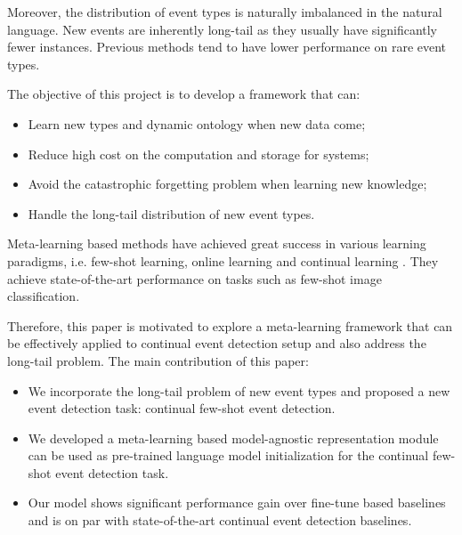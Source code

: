 Moreover, the distribution of event types is naturally imbalanced in the natural language.  New events are inherently long-tail \citep{yu2021lifelong} as they usually have significantly fewer instances. Previous methods \citep{nguyen2016two, cao2020incremental} tend to have lower performance on rare event types.  

The objective of this project is to develop a framework that can:
\begin{itemize}[noitemsep]
\item Learn new types and dynamic ontology when new data come;
 \item Reduce high cost on the computation and storage for systems;
 \item Avoid the catastrophic forgetting problem when learning new knowledge;
\item Handle the long-tail distribution of new event types.
\end{itemize}

Meta-learning based methods have achieved great success in various learning paradigms, i.e. few-shot learning, online learning and continual learning \citep{harrison2019continuous, javed2019meta}. They achieve state-of-the-art performance on tasks such as few-shot image classification. 



Therefore, this paper is motivated to explore a meta-learning framework that can be effectively applied to continual event detection setup and also address the long-tail problem.  The main contribution of this paper:

\begin{itemize}[noitemsep]
\item We incorporate the long-tail problem of new event types and proposed a new event detection task: continual few-shot event detection.

  \item We developed a meta-learning based model-agnostic representation module can be used as pre-trained language model initialization for the continual few-shot event detection task.
  \item Our model shows significant performance gain over fine-tune based baselines and is on par with state-of-the-art continual event detection baselines.
\end{itemize}
